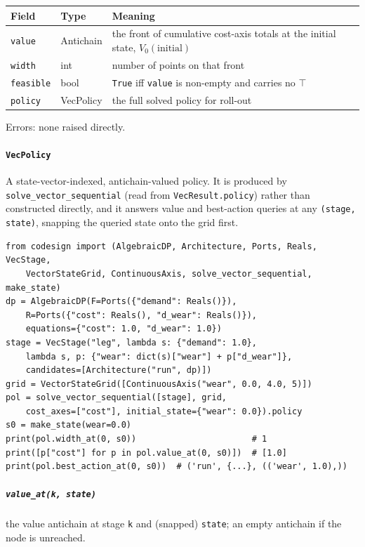 \documentclass[11pt,a4paper]{article}
\newcommand{\topp}{\top}
\begin{document}
\begin{center}
\begin{tabular}{@{}llp{}@{}}
\toprule
Field & Type & Meaning \\
\midrule
\texttt{value} & Antichain & the front of cumulative cost-axis totals at the
  initial state, \(V_0(\text{initial})\) \\
\texttt{width} & int & number of points on that front \\
\texttt{feasible} & bool & \texttt{True} iff \texttt{value} is non-empty and
  carries no \(\topp\) \\
\texttt{policy} & VecPolicy & the full solved policy for roll-out \\
\bottomrule
\end{tabular}
\end{center}
Errors: none raised directly.

\paragraph{\texttt{VecPolicy}}\label{ref:vector_dp:vecpolicy}
A state-vector-indexed, antichain-valued policy. It is produced by
\texttt{solve\_\allowbreak vector\_\allowbreak sequential} (read from
\texttt{VecResult.policy})
rather than constructed directly, and it answers value and best-action
queries at any \texttt{(stage, state)}, snapping the queried state onto the
grid first.

\begin{lstlisting}
from codesign import (AlgebraicDP, Architecture, Ports, Reals, VecStage,
    VectorStateGrid, ContinuousAxis, solve_vector_sequential, make_state)
dp = AlgebraicDP(F=Ports({"demand": Reals()}),
    R=Ports({"cost": Reals(), "d_wear": Reals()}),
    equations={"cost": 1.0, "d_wear": 1.0})
stage = VecStage("leg", lambda s: {"demand": 1.0},
    lambda s, p: {"wear": dict(s)["wear"] + p["d_wear"]},
    candidates=[Architecture("run", dp)])
grid = VectorStateGrid([ContinuousAxis("wear", 0.0, 4.0, 5)])
pol = solve_vector_sequential([stage], grid,
    cost_axes=["cost"], initial_state={"wear": 0.0}).policy
s0 = make_state(wear=0.0)
print(pol.width_at(0, s0))                       # 1
print([p["cost"] for p in pol.value_at(0, s0)])  # [1.0]
print(pol.best_action_at(0, s0))  # ('run', {...}, (('wear', 1.0),))
\end{lstlisting}

\subparagraph{\texttt{value\_at(k, state)}} the value antichain at stage
\texttt{k} and (snapped) \texttt{state}; an empty antichain if the node is
unreached.
\end{document}
